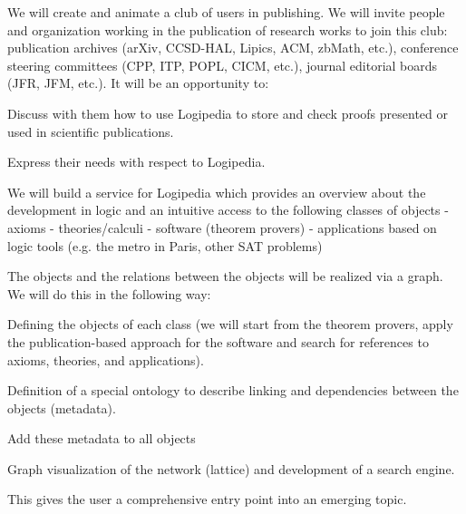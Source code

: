 \begin{workpackage}[id=dissemination,type=MGT,
  short={Dissemination},
  title={Dissemination, communication and exploitation},
  lead=Inr,InrRM=12,BirRM=4,IrtRM=4,ImtRM=2,StrRM=2,ZibRM=14,EduRM=12]
\begin{tasklist}
\begin{task}[id=teachers-club,
      title=Expanding the use of Logipedia in education,
      lead=Str,StrRM=2,wphases=7-42!.05]
  \end{task}

  \begin{task}[id=publishers-club,
      title=Expanding the use of Logipedia in publishing,
      lead=Zib,ZibRM=2,wphases=7-42!.05]
    We will create and animate a club of users in publishing. We will invite
    people and organization working in the publication of research
    works to join this club: publication archives (arXiv, CCSD-HAL,
    Lipics, ACM, zbMath, etc.), conference steering committees (CPP,
    ITP, POPL, CICM, etc.), journal editorial boards (JFR, JFM,
    etc.). It will be an opportunity to:
    \begin{compactitem}
    \item Discuss with them how to use Logipedia to store and check
      proofs presented or used in scientific publications.
    \item Express their needs with respect to Logipedia.
    \end{compactitem}
  \end{task}

  \begin{task}[id=zib,
      title=Linking scientific publications to Logipedia,
      lead=Zib,ZibRM=12,wphases=12-23]
    We will build a service for Logipedia which provides an overview
    about the development in logic and an intuitive access to the
    following classes of objects - axioms - theories/calculi -
    software (theorem provers) - applications based on logic tools
    (e.g. the metro in Paris, other SAT problems)

    The objects and the relations between the objects will be
    realized via a graph. We will do this in the following way:
    \begin{compactitem}
    \item Defining the objects of each class (we will start from the
      theorem provers, apply the publication-based approach for the
      software and search for references to axioms, theories, and
      applications).
    \item Definition of a special ontology to describe linking and
      dependencies between the objects (metadata).
    \item Add these metadata to all objects
    \item Graph visualization of the network (lattice) and development
      of a search engine.
    \end{compactitem}
    This gives the user a comprehensive entry point into an emerging
    topic.
  \end{task}


\end{tasklist}
\end{workpackage}
